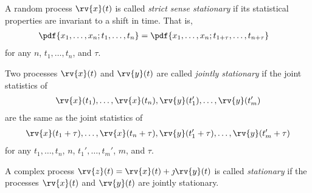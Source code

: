\begin{definitionBox}
    A random process $\rv{x}(t)$ is called \emph{strict sense stationary} if its statistical properties are invariant to a shift in time. That is,
    \begin{align}
        \pdf{x_{1}, \ldots, x_{n}; t_{1}, \ldots, t_{n}} &=
        \pdf{x_{1}, \ldots, x_{n}; t_{1+\tau}, \ldots, t_{n+\tau}}
    \end{align}
    for any $n$, $t_{1}, \ldots, t_{n}$, and $\tau$.
\end{definitionBox}

\begin{definitionBox}
    Two processes $\rv{x}(t)$ and $\rv{y}(t)$ are called \emph{jointly stationary} if the joint statistics of 
    \begin{align}
        \rv{x}(t_{1}), \ldots, \rv{x}(t_{n}), \rv{y}(t_{1}^{\prime}), \ldots, \rv{y}(t_{m}^{\prime})
    \end{align}
    are the same as the joint statistics of 
    \begin{align}
        \rv{x}(t_{1} + \tau), \ldots, \rv{x}(t_{n} + \tau), \rv{y}(t_{1}^{\prime} + \tau), \ldots, \rv{y}(t_{m}^{\prime} + \tau)
    \end{align}
    for any $t_{1}, \ldots, t_{n}$, $n$, $t_{1}', \ldots, t_{m}'$, $m$, and $\tau$. 
\end{definitionBox}

\begin{definitionBox}
    A complex process $\rv{z}(t) = \rv{x}(t) + \jmath \rv{y}(t)$ is called \emph{stationary} if the processes $\rv{x}(t)$ and $\rv{y}(t)$ are jointly stationary.
\end{definitionBox}

